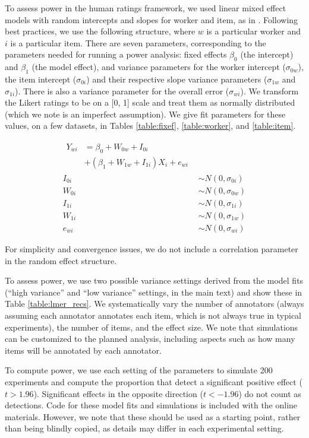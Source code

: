 \documentclass[11pt,a4paper]{article}
\begin{document}
To assess power in the human ratings framework, we used linear mixed effect models with random intercepts and slopes for worker and item, as in \citet{barr2013random}. Following best practices, we use the following structure, where $w$ is a particular worker and $i$ is a particular item. There are seven parameters, corresponding to the parameters needed for running a power analysis: fixed effects $\beta_{0}$ (the intercept) and $\beta_{1}$ (the model effect), and variance parameters for the worker intercept ($\sigma_{0w}$), the item intercept ($\sigma_{0i}$) and their respective slope variance parameters ($\sigma_{1w}$ and $\sigma_{1i}$). There is also a variance parameter for the overall error ($\sigma_{wi}$). We transform the Likert ratings to be on a [0, 1] scale and treat them as normally distributed (which we note is an imperfect assumption). 
We give fit parameters for these values, on a few datasets, in Tables \ref{table:fixef}, \ref{table:worker}, and \ref{table:item}.

\begin{align}
\begin{split}
Y_{wi} &= \beta_{0} + W_{0w} + I_{0i} \\ &+  (\beta_{1}+W_{1w} + I_{1i})X_{i} + e_{wi} 
\end{split} \\
I_{0i} &\sim N(0, \sigma_{0i}) \\
W_{0i} &\sim N(0, \sigma_{0w}) \\
I_{1i} &\sim N(0, \sigma_{1i}) \\
W_{1i} &\sim N(0, \sigma_{1w}) \\
e_{wi} &\sim N(0, \sigma_{wi})
\end{align}

For simplicity and convergence issues, we do not include a correlation parameter in the random effect structure.

To assess power, we use two possible variance settings derived from the model fits (``high variance'' and ``low variance'' settings, in the main text) and show these in Table \ref{table:lmer_recs}. We systematically vary the number of annotators (always assuming each annotator annotates each item, which is not always true in typical experiments), the number of items, and the effect size. We note that simulations can be customized to the planned analysis, including aspects such as how many items will be annotated by each annotator.

To compute power, we use each setting of the parameters to simulate 200 experiments and compute the proportion that detect a significant positive effect ($t > 1.96$). Significant effects in the opposite direction ($t < -1.96$) do not count as detections. Code for these model fits and simulations is included with the online materials. However, we note that these should be used as a starting point, rather than being blindly copied, as details may differ in each experimental setting.
\end{document}
